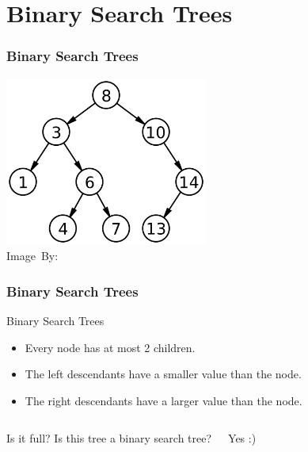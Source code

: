 \section{Binary Search Trees}
\label{sec:binary_search_trees}

\begin{frame}
	\frametitle{Binary Search Trees}
	\begin{center}
		\includegraphics[width=0.5\textwidth]{figures/btree.png}\\
		\hspace*{15pt}\hbox{\scriptsize Image By:}
	\end{center}
\end{frame}

\begin{frame}
	\frametitle{Binary Search Trees}
	
	\begin{block}{Binary \alert{Search} Trees}
		\begin{itemize}
			\item Every node has at most 2 children.
				\pause
			\item The left descendants have a smaller value than the node.
			\item The right descendants have a larger value than the node.
		\end{itemize}
	\end{block}	
	\pause
	\begin{columns}


		\begin{questionblock}{Is it full?}
			Is this tree a binary search tree?
		\end{questionblock}
		\pause
		\begin{answerblock}{}
			Yes :)	
		\end{answerblock}
	\end{columns}
\end{frame}

